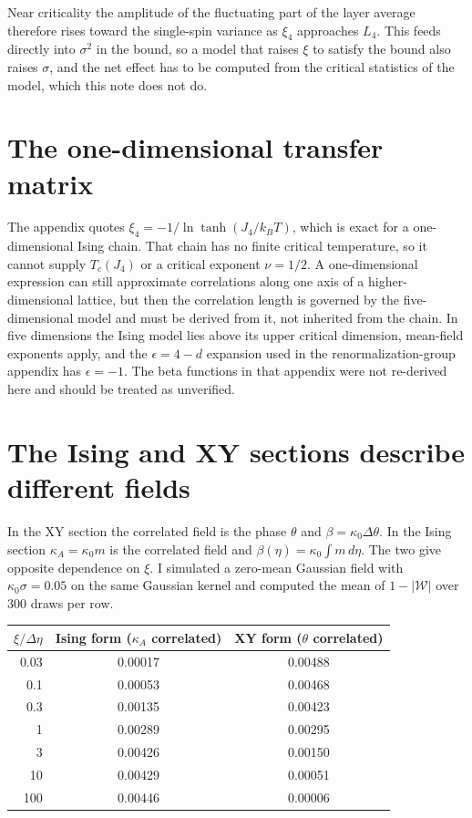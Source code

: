\documentclass[11pt]{article}
\theoremstyle{remark}
\newcommand{\Wrec}{\Delta\eta}
\begin{document}
Near criticality the amplitude of the fluctuating part of the layer average therefore rises toward the single-spin variance as $\xi_4$ approaches $L_4$. This feeds directly into $\sigma^2$ in the bound, so a model that raises $\xi$ to satisfy the bound also raises $\sigma$, and the net effect has to be computed from the critical statistics of the model, which this note does not do.

\section{The one-dimensional transfer matrix}

The appendix quotes $\xi_4=-1/\ln\tanh(J_4/k_BT)$, which is exact for a one-dimensional Ising chain. That chain has no finite critical temperature, so it cannot supply $T_c(J_4)$ or a critical exponent $\nu=1/2$. A one-dimensional expression can still approximate correlations along one axis of a higher-dimensional lattice, but then the correlation length is governed by the five-dimensional model and must be derived from it, not inherited from the chain. In five dimensions the Ising model lies above its upper critical dimension, mean-field exponents apply, and the $\epsilon=4-d$ expansion used in the renormalization-group appendix has $\epsilon=-1$. The beta functions in that appendix were not re-derived here and should be treated as unverified.

\section{The Ising and XY sections describe different fields}

In the XY section the correlated field is the phase $\theta$ and $\beta=\kappa_0\Delta\theta$. In the Ising section $\kappa_A=\kappa_0 m$ is the correlated field and $\beta(\eta)=\kappa_0\int m\,d\eta$. The two give opposite dependence on $\xi$. I simulated a zero-mean Gaussian field with $\kappa_0\sigma=0.05$ on the same Gaussian kernel and computed the mean of $1-|\mathcal W|$ over 300 draws per row.

\begin{table}[h]
\centering\small
\begin{tabular}{rcc}
\toprule
$\xi/\Wrec$ & Ising form ($\kappa_A$ correlated) & XY form ($\theta$ correlated) \\
\midrule
0.03 & 0.00017 & 0.00488 \\
0.1 & 0.00053 & 0.00468 \\
0.3 & 0.00135 & 0.00423 \\
1 & 0.00289 & 0.00295 \\
3 & 0.00426 & 0.00150 \\
10 & 0.00429 & 0.00051 \\
100 & 0.00446 & 0.00006 \\
\bottomrule
\end{tabular}
\end{table}
\end{document}
